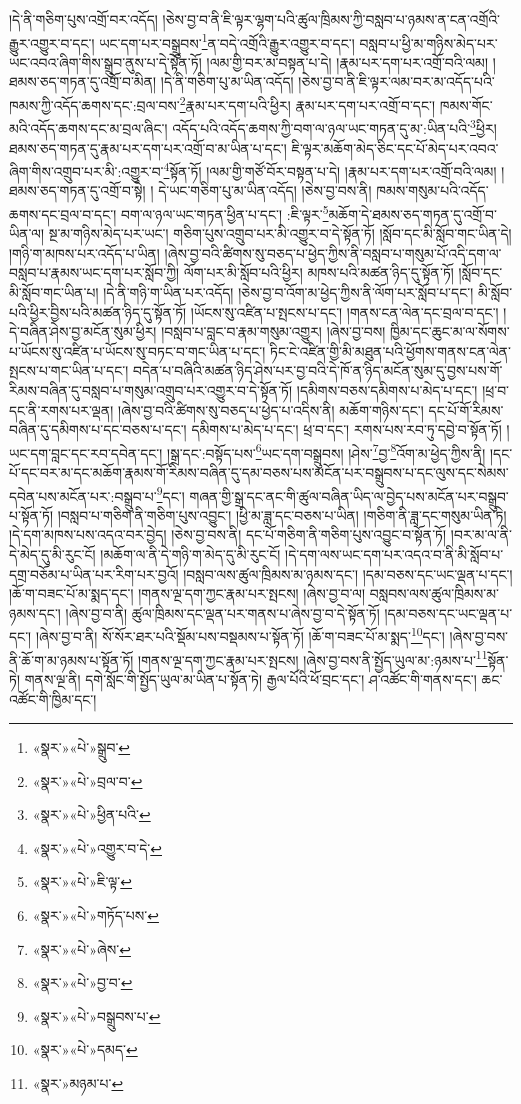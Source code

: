 །དེ་ནི་གཅིག་པུས་འགྲོ་བར་འདོད། །ཅེས་བྱ་བ་ནི་ཇི་ལྟར་ལྷག་པའི་ཚུལ་ཁྲིམས་ཀྱི་བསླབ་པ་ཉམས་ན་ངན་འགྲོའི་རྒྱུར་འགྱུར་བ་དང་། ཡང་དག་པར་བསྒྲུབས་\footnote{«སྣར་»«པེ་»སྒྲུབ་}ན་བདེ་འགྲོའི་རྒྱུར་འགྱུར་བ་དང་། བསླབ་པ་ཕྱི་མ་གཉིས་མེད་པར་ཡང་འབའ་ཞིག་གིས་སྒྲུབ་ནུས་པ་དེ་སྟོན་ཏོ། །ལམ་གྱི་བར་མ་བསྟན་པ་དེ། །རྣམ་པར་དག་པར་འགྲོ་བའི་ལམ། །ཐམས་ཅད་གཏན་དུ་འགྲོ་བ་མིན། །དེ་ནི་གཅིག་པུ་མ་ཡིན་འདོད། །ཅེས་བྱ་བ་ནི་ཇི་ལྟར་ལམ་བར་མ་འདོད་པའི་ཁམས་ཀྱི་འདོད་ཆགས་དང་:བྲལ་བས་\footnote{«སྣར་»«པེ་»བྲལ་བ་}རྣམ་པར་དག་པའི་ཕྱིར། རྣམ་པར་དག་པར་འགྲོ་བ་དང་། ཁམས་གོང་མའི་འདོད་ཆགས་དང་མ་བྲལ་ཞིང་། འདོད་པའི་འདོད་ཆགས་ཀྱི་བག་ལ་ཉལ་ཡང་གཏན་དུ་མ་:ཡིན་པའི་\footnote{«སྣར་»«པེ་»ཕྱིན་པའི་}ཕྱིར། ཐམས་ཅད་གཏན་དུ་རྣམ་པར་དག་པར་འགྲོ་བ་མ་ཡིན་པ་དང་། ཇི་ལྟར་མཆོག་མེད་ཅིང་དང་པོ་མེད་པར་འབའ་ཞིག་གིས་འགྲུབ་པར་མི་:འགྱུར་བ་\footnote{«སྣར་»«པེ་»འགྱུར་བ་དེ་}སྟོན་ཏོ། །ལམ་གྱི་གཙོ་བོར་བསྟན་པ་དེ། །རྣམ་པར་དག་པར་འགྲོ་བའི་ལམ། །ཐམས་ཅད་གཏན་དུ་འགྲོ་བ་སྟེ། །
དེ་ཡང་གཅིག་པུ་མ་ཡིན་འདོད། །ཅེས་བྱ་བས་ནི། ཁམས་གསུམ་པའི་འདོད་ཆགས་དང་བྲལ་བ་དང་། བག་ལ་ཉལ་ཡང་གཏན་ཕྱིན་པ་དང་། :ཇི་ལྟར་\footnote{«སྣར་»«པེ་»ཇི་ལྟ་}མཆོག་དེ་ཐམས་ཅད་གཏན་དུ་འགྲོ་བ་ཡིན་ལ། སྔ་མ་གཉིས་མེད་པར་ཡང་། གཅིག་པུས་འགྲུབ་པར་མི་འགྱུར་བ་དེ་སྟོན་ཏོ། །སློབ་དང་མི་སློབ་གང་ཡིན་དེ། །གཉི་ག་མཁས་པར་འདོད་པ་ཡིན། །ཞེས་བྱ་བའི་ཚིགས་སུ་བཅད་པ་ཕྱེད་ཀྱིས་ནི་བསླབ་པ་གསུམ་པོ་འདི་དག་ལ་བསླབ་པ་རྣམས་ཡང་དག་པར་སློབ་ཀྱི། ལོག་པར་མི་སློབ་པའི་ཕྱིར། མཁས་པའི་མཚན་ཉིད་དུ་སྟོན་ཏོ། །སློབ་དང་མི་སློབ་གང་ཡིན་པ། །དེ་ནི་གཉི་ག་ཡིན་པར་འདོད། །ཅེས་བྱ་བ་འོག་མ་ཕྱེད་ཀྱིས་ནི་ལོག་པར་སློབ་པ་དང་། མི་སློབ་པའི་ཕྱིར་བྱིས་པའི་མཚན་ཉིད་དུ་སྟོན་ཏོ། །ཡོངས་སུ་འཛིན་པ་སྤངས་པ་དང་། །གནས་ངན་ལེན་དང་བྲལ་བ་དང་། །དེ་བཞིན་ཤེས་བྱ་མངོན་སུམ་ཕྱིར། །བསླབ་པ་བླང་བ་རྣམ་གསུམ་འགྱུར། །ཞེས་བྱ་བས། ཁྱིམ་དང་ཆུང་མ་ལ་སོགས་པ་ཡོངས་སུ་འཛིན་པ་ཡོངས་སུ་བཏང་བ་གང་ཡིན་པ་དང་། ཏིང་ངེ་འཛིན་གྱི་མི་མཐུན་པའི་ཕྱོགས་གནས་ངན་ལེན་སྤངས་པ་གང་ཡིན་པ་དང་། བདེན་པ་བཞིའི་མཚན་ཉིད་ཤེས་པར་བྱ་བའི་དེ་ཁོ་ན་ཉིད་མངོན་སུམ་དུ་བྱས་པས་གོ་རིམས་བཞིན་དུ་བསླབ་པ་གསུམ་འགྲུབ་པར་འགྱུར་བ་དེ་སྟོན་ཏོ། །དམིགས་བཅས་དམིགས་པ་མེད་པ་དང་། །ཕྲ་བ་དང་ནི་རགས་པར་ལྡན། །ཞེས་བྱ་བའི་ཚིགས་སུ་བཅད་པ་ཕྱེད་པ་འདིས་ནི། མཆོག་གཉིས་དང་། དང་པོ་གོ་རིམས་བཞིན་དུ་དམིགས་པ་དང་བཅས་པ་དང་། དམིགས་པ་མེད་པ་དང་། ཕྲ་བ་དང་། རགས་པས་རབ་ཏུ་དབྱེ་བ་སྟོན་ཏོ། །ཡང་དག་བླང་དང་རབ་དབེན་དང་། །སྒྲ་དང་:བསྟོད་པས་\footnote{«སྣར་»«པེ་»གཏོད་པས་}ཡང་དག་བསྒྲུབས། །ཤེས་\footnote{«སྣར་»«པེ་»ཞེས་}བྱ་\footnote{«སྣར་»«པེ་»བྱ་བ་}འོག་མ་ཕྱེད་ཀྱིས་ནི། །དང་པོ་དང་བར་མ་དང་མཆོག་རྣམས་གོ་རིམས་བཞིན་དུ་དམ་བཅས་པས་མངོན་པར་བསྒྲུབས་པ་དང་ལུས་དང་སེམས་དབེན་པས་མངོན་པར་:བསྒྲུབ་པ་\footnote{«སྣར་»«པེ་»བསྒྲུབས་པ་}དང་། གཞན་གྱི་སྒྲ་དང་ནང་གི་ཚུལ་བཞིན་ཡིད་ལ་བྱེད་པས་མངོན་པར་བསྒྲུབ་པ་སྟོན་ཏོ། །བསླབ་པ་གཅིག་ནི་གཅིག་པུས་འབྱུང་། །ཕྱི་མ་ཟླ་དང་བཅས་པ་ཡིན། །གཅིག་ནི་ཟླ་དང་གསུམ་ཡིན་ཏེ། །དེ་དག་མཁས་པས་འདའ་བར་བྱེད། །ཅེས་བྱ་བས་ནི། དང་པོ་གཅིག་ནི་གཅིག་པུས་འབྱུང་བ་སྟོན་ཏོ། །བར་མ་ལ་ནི་དེ་མེད་དུ་མི་རུང་ངོ། །མཆོག་ལ་ནི་དེ་གཉི་ག་མེད་དུ་མི་རུང་ངོ། །དེ་དག་ལས་ཡང་དག་པར་འདའ་བ་ནི་མི་སློབ་པ་དགྲ་བཅོམ་པ་ཡིན་པར་རིག་པར་བྱའོ། །བསླབ་ལས་ཚུལ་ཁྲིམས་མ་ཉམས་དང་། །དམ་བཅས་དང་ཡང་ལྡན་པ་དང་། །ཆོ་ག་བཟང་པོ་མ་སྨད་དང་། །གནས་ལྔ་དག་ཀྱང་རྣམ་པར་སྤངས། །ཞེས་བྱ་བ་ལ། བསླབས་ལས་ཚུལ་ཁྲིམས་མ་ཉམས་དང་། །ཞེས་བྱ་བ་ནི། ཚུལ་ཁྲིམས་དང་ལྡན་པར་གནས་པ་ཞེས་བྱ་བ་དེ་སྟོན་ཏོ། །དམ་བཅས་དང་ཡང་ལྡན་པ་དང་། །ཞེས་བྱ་བ་ནི། སོ་སོར་ཐར་པའི་སྡོམ་པས་བསྡམས་པ་སྟོན་ཏོ། །ཆོ་ག་བཟང་པོ་མ་སྨད་\footnote{«སྣར་»«པེ་»དམད་}དང་། །ཞེས་བྱ་བས་ནི་ཆོ་ག་མ་ཉམས་པ་སྟོན་ཏོ། །གནས་ལྔ་དག་ཀྱང་རྣམ་པར་སྤངས། །ཞེས་བྱ་བས་ནི་སྤྱོད་ཡུལ་མ་:ཉམས་པ་\footnote{«སྣར་»མཉམ་པ་}སྟོན་ཏེ། གནས་ལྔ་ནི། དགེ་སློང་གི་སྤྱོད་ཡུལ་མ་ཡིན་པ་སྟོན་ཏེ། རྒྱལ་པོའི་ཕོ་བྲང་དང་། ཤ་འཚོང་གི་གནས་དང་། ཆང་འཚོང་གི་ཁྱིམ་དང་། 
